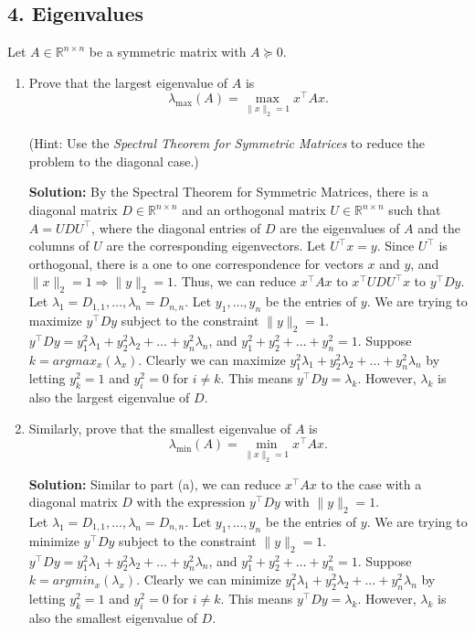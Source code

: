 \documentclass{article}
\newcommand{\solution}{\textbf{Solution: }}
\newcommand{\R}{\mathbb{R}}
\begin{document}
\subsection*{4. Eigenvalues}
Let $A \in \R^{n\times n}$ be a symmetric matrix with $A \succeq 0$. 
\begin{enumerate}[label=(\alph*)]
    \item Prove that the largest eigenvalue of $A$ is $$\lambda_{\max}(A) = \max_{\lVert x \rVert_2 = 1} x^{\top} Ax.$$ \\
    (Hint: Use the \emph{Spectral Theorem for Symmetric Matrices} to reduce the problem to the diagonal case.)
    \begin{mdframed} \solution
    By the Spectral Theorem for Symmetric Matrices, there is a diagonal matrix $D\in \R^{n\times n}$ and an orthogonal matrix $U\in \R^{n\times n}$ such that $A=UDU^{\top}$, where the diagonal entries of $D$ are the eigenvalues of $A$ and the columns of $U$ are the corresponding eigenvectors. Let $U^{\top}x=y$. Since $U^{\top}$ is orthogonal, there is a one to one correspondence for vectors $x$ and $y$, and $\lVert x\rVert_2=1 \Rightarrow \lVert y\rVert_2=1$. Thus, we can reduce $x^{\top}Ax$ to $x^{\top}UDU^{\top}x$ to $y^{\top}Dy$.\\
    
    Let $\lambda_1=D_{1,1}, \dots, \lambda_n=D_{n,n}$. Let $y_1, \dots, y_n$ be the entries of $y$. We are trying to maximize $y^{\top}Dy$ subject to the constraint $\lVert y \rVert_2 = 1.$\\
    $y^{\top}Dy=y_1^2\lambda_1 + y_2^2\lambda_2 + \dots + y_n^2\lambda_n$, and $y_1^2 + y_2^2 + \dots + y_n^2 = 1$. Suppose $k=argmax_x(\lambda_x)$. Clearly we can maximize $y_1^2\lambda_1 + y_2^2\lambda_2 + \dots + y_n^2\lambda_n$ by letting $y_k^2=1$ and $y_i^2=0$ for $i\neq k$. This means $y^{\top}Dy=\lambda_k$. However, $\lambda_k$ is also the largest eigenvalue of $D$.
    \end{mdframed}
    
    \item Similarly, prove that the smallest eigenvalue of $A$ is $$\lambda_{\min}(A) = \min_{\lVert x\rVert_2 = 1} x^{\top} Ax.$$
    \begin{mdframed}
    \solution Similar to part (a), we can reduce $x^{\top}Ax$ to the case with a diagonal matrix $D$ with the expression $y^{\top}Dy$ with $\lVert y \rVert_2 = 1$.\\
    
    Let $\lambda_1=D_{1,1}, \dots, \lambda_n=D_{n,n}$. Let $y_1, \dots, y_n$ be the entries of $y$. We are trying to minimize $y^{\top}Dy$ subject to the constraint $\lVert y \rVert_2 = 1.$\\
    $y^{\top}Dy=y_1^2\lambda_1 + y_2^2\lambda_2 + \dots + y_n^2\lambda_n$, and $y_1^2 + y_2^2 + \dots + y_n^2 = 1$. Suppose $k=argmin_x(\lambda_x)$. Clearly we can minimize $y_1^2\lambda_1 + y_2^2\lambda_2 + \dots + y_n^2\lambda_n$ by letting $y_k^2=1$ and $y_i^2=0$ for $i\neq k$. This means $y^{\top}Dy=\lambda_k$. However, $\lambda_k$ is also the smallest eigenvalue of $D$.
    \end{mdframed}
    

\end{enumerate}
\end{document}

